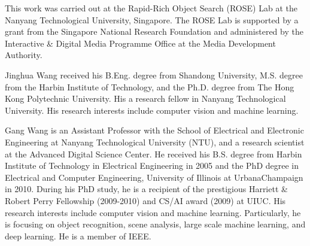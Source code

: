 \documentclass[journal]{IEEEtran}
\begin{document}
This work was carried out at the Rapid-Rich Object Search
(ROSE) Lab at the Nanyang Technological University, Singapore.
The ROSE Lab is supported by a grant from the
Singapore National Research Foundation and administered by
the Interactive \& Digital Media Programme Office at the
Media Development Authority.



\ifCLASSOPTIONcaptionsoff
  \newpage
\fi













\begin{IEEEbiography}{Jinghua Wang}
received his B.Eng. degree from Shandong University, M.S. degree from the Harbin Institute of Technology, and the Ph.D. degree from The Hong Kong Polytechnic University. His a research fellow in Nanyang Technological University. His research interests
include computer vision and
machine learning.

\end{IEEEbiography}

\begin{IEEEbiography}{Gang Wang}
is an Assistant Professor with the
School of Electrical and Electronic Engineering at
Nanyang Technological University (NTU), and a
research scientist at the Advanced Digital Science
Center. He received his B.S. degree from Harbin
Institute of Technology in Electrical Engineering in
2005 and the PhD degree in Electrical and Computer
Engineering, University of Illinois at UrbanaChampaign
in 2010. During his PhD study, he is a recipient of the prestigious Harriett \& Robert Perry
Fellowship (2009-2010) and CS/AI award (2009) at
UIUC. His research interests include computer vision and machine learning.
Particularly, he is focusing on object recognition, scene analysis, large scale
machine learning, and deep learning. He is a member of IEEE.
\end{IEEEbiography}
\end{document}
